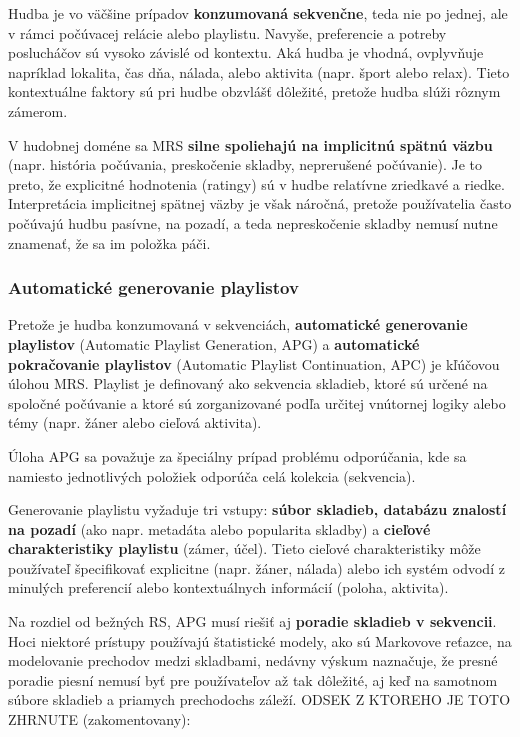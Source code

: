 Hudba je vo väčšine prípadov \textbf{konzumovaná sekvenčne}, teda nie po jednej, ale v rámci počúvacej relácie alebo playlistu. Navyše, preferencie a potreby poslucháčov sú vysoko závislé od kontextu. Aká hudba je vhodná, ovplyvňuje napríklad lokalita, čas dňa, nálada, alebo aktivita (napr. šport alebo relax). Tieto kontextuálne faktory sú pri hudbe obzvlášť dôležité, pretože hudba slúži rôznym zámerom.\cite{challenges}

V hudobnej doméne sa MRS \textbf{silne spoliehajú na implicitnú spätnú väzbu} (napr. história počúvania, preskočenie skladby, neprerušené počúvanie). Je to preto, že explicitné hodnotenia (ratingy) sú v hudbe relatívne zriedkavé a riedke.\cite{Ricci, 44vRicci} Interpretácia implicitnej spätnej väzby je však náročná, pretože používatelia často počúvajú hudbu pasívne, na pozadí, a teda nepreskočenie skladby nemusí nutne znamenať, že sa im položka páči.\cite{challenges}

\subsubsection{Automatické generovanie playlistov}
Pretože je hudba konzumovaná v sekvenciách, \textbf{automatické generovanie playlistov} (Automatic Playlist Generation, APG) a \textbf{automatické pokračovanie playlistov} (Automatic Playlist Continuation, APC) je kľúčovou úlohou MRS.\cite{Ricci, challenges} Playlist je definovaný ako sekvencia skladieb, ktoré sú určené na spoločné počúvanie a ktoré sú zorganizované podľa určitej vnútornej logiky alebo témy (napr. žáner alebo cieľová aktivita).\cite{survey}

Úloha APG sa považuje za špeciálny prípad problému odporúčania, kde sa namiesto jednotlivých položiek odporúča celá kolekcia (sekvencia).\cite{survey, challenges}

Generovanie playlistu vyžaduje tri vstupy: \textbf{súbor skladieb, databázu znalostí na pozadí} (ako napr. metadáta alebo popularita skladby) a \textbf{cieľové charakteristiky playlistu} (zámer, účel). Tieto cieľové charakteristiky môže používateľ špecifikovať explicitne (napr. žáner, nálada) alebo ich systém odvodí z minulých preferencií alebo kontextuálnych informácií (poloha, aktivita).\cite{survey}

Na rozdiel od bežných RS, APG musí riešiť aj \textbf{poradie skladieb v sekvencii}. Hoci niektoré prístupy používajú štatistické modely, ako sú Markovove reťazce, na modelovanie prechodov medzi skladbami, nedávny výskum naznačuje, že presné poradie piesní nemusí byť pre používateľov až tak dôležité, aj keď na samotnom súbore skladieb a priamych prechodochs záleží.\cite{challenges}
ODSEK Z KTOREHO JE TOTO ZHRNUTE (zakomentovany): %

